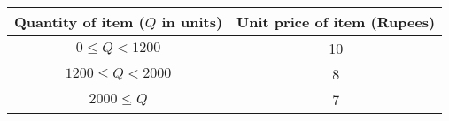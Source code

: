 \begin{center}
\begin{tabular}{|c|c|}
\hline
Quantity of item ($Q$ in units) & Unit price of item (Rupees) \\
\hline
$0 \le Q < 1200$ & 10 \\
\hline
$1200 \le Q < 2000$ & 8 \\
\hline
$2000 \le Q$ & 7 \\
\hline
\end{tabular}
\end{center}
